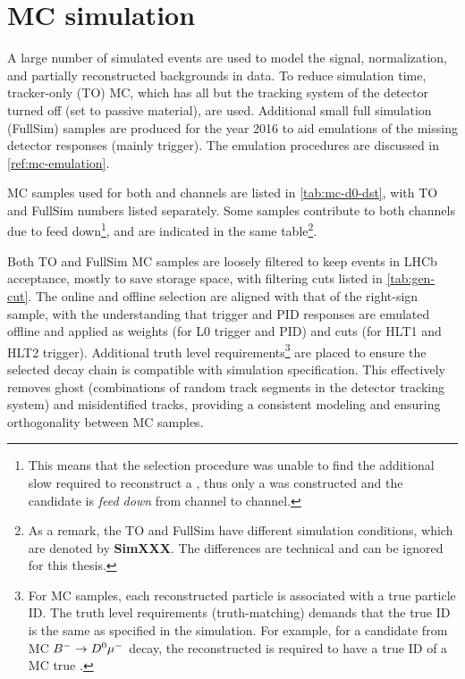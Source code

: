 \section{MC simulation}
\label{ref:sel:mc}

A large number of simulated events are used to model the signal, normalization,
and partially reconstructed backgrounds in data.
To reduce simulation time, tracker-only (TO) MC, which has all but the tracking
system of the detector turned off (set to passive material), are used.
Additional small full simulation (FullSim) samples are produced for the year
2016 to aid emulations of the missing detector responses (mainly trigger).
The emulation procedures are discussed in \cref{ref:mc-emulation}.

MC samples used for both \Dz and \Dstar channels are listed in
\cref{tab:mc-d0-dst}, with TO and FullSim numbers listed separately.
Some samples contribute to both channels due to feed down\footnote{
    This means that the selection procedure was unable to find the
    additional slow \pion required to reconstruct a \Dstar, thus only a
    \Dz was constructed and the candidate is \emph{feed down} from \Dstar
    channel to \Dz channel.
}, and are indicated in the same table\footnote{
    As a remark, the TO and FullSim have different simulation conditions,
    which are denoted by \textbf{SimXXX}.
    The differences are technical and can be ignored for this thesis.
}.


\afterpage{
    
}


Both TO and FullSim MC samples are loosely filtered to keep events in LHCb
acceptance, mostly to save storage space,
with filtering cuts listed in \cref{tab:gen-cut}.
The online and offline selection are aligned with that of the right-sign sample,
with the understanding that trigger and PID responses are emulated offline and
applied as weights (for L0 trigger and PID) and cuts
(for HLT1 and HLT2 trigger).
Additional truth level requirements\footnote{
    For MC samples, each reconstructed particle is associated with a true
    particle ID. The truth level requirements (truth-matching) demands that
    the true ID is the same as specified in the simulation.
    For example, for a candidate from  MC ${{{B}^-}} \rightarrow {\ensuremath{{D}^0}}{\ensuremath{\mu^-}}$ decay,
    the reconstructed \muon is required to have a true ID of a MC true \muon.
} are placed to ensure the selected decay
chain is compatible with simulation specification.
This effectively removes ghost
(combinations of random track segments in the detector tracking system)
and misidentified tracks,
providing a consistent modeling and ensuring orthogonality between MC samples.

